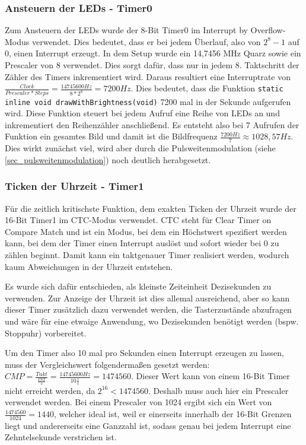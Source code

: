 \subsubsection{Ansteuern der LEDs - Timer0}
Zum Ansteuern der LEDs wurde der 8-Bit Timer0 im \glqq Interrupt by Overflow\grqq -Modus verwendet. Dies bedeutet, dass er bei jedem Überlauf, also von $2^8-1$ auf $0$, einen Interrupt erzeugt. In dem Setup wurde ein 14,7456 MHz Quarz sowie ein Prescaler von 8 verwendet. Dies sorgt dafür, dass nur in jedem 8. Taktschritt der Zähler des Timers inkrementiert wird. Daraus resultiert eine Interruptrate von $\frac{Clock}{Prescaler * Steps} = \frac{14745600 Hz}{8 * 2^8} = 7200 Hz$. Dies bedeutet, dass die Funktion \texttt{static inline void drawWithBrightness(void)} 7200 mal in der Sekunde aufgerufen wird. Diese Funktion steuert bei jedem Aufruf eine Reihe von LEDs an und inkrementiert den Reihenzähler anschließend. Es entsteht also bei 7 Aufrufen der Funktion ein gesamtes Bild und damit ist die Bildfrequenz $\frac{7200 Hz}{7} \approx 1028,57 Hz$. Dies wirkt zunächst viel, wird aber durch die Pulsweitenmodulation (siehe \ref{sec_pulsweitenmodulation}) noch deutlich herabgesetzt.

\subsubsection{Ticken der Uhrzeit - Timer1}
Für die zeitlich kritischste Funktion, dem exakten Ticken der Uhrzeit wurde der 16-Bit Timer1 im \glqq CTC\grqq -Modus verwendet. CTC steht für Clear Timer on Compare Match und ist ein Modus, bei dem ein Höchstwert spezifiert werden kann, bei dem der Timer einen Interrupt auslöst und sofort wieder bei 0 zu zählen beginnt. Damit kann ein taktgenauer Timer realisiert werden, wodurch kaum Abweichungen in der Uhrzeit entstehen.

Es wurde sich dafür entschieden, als kleinste Zeiteinheit Dezisekunden zu verwenden. Zur Anzeige der Uhrzeit ist dies allemal ausreichend, aber so kann dieser Timer zusätzlich dazu verwendet werden, die Tasterzustände abzufragen und wäre für eine etwaige Anwendung, wo Dezisekunden benötigt werden (bspw. Stoppuhr) vorbereitet.

Um den Timer also 10 mal pro Sekunden einen Interrupt erzeugen zu lassen, muss der Vergleichswert folgendermaßen gesetzt werden: $CMP = \frac{Takt}{\frac{INT}{s}} = \frac{14745600 Hz}{10 \frac{1}{s}} = 1474560$. Dieser Wert kann von einem 16-Bit Timer nicht erreicht werden, da $2^16 < 1474560$. Deshalb muss auch hier ein Prescaler verwendet werden. Bei einem Prescaler von 1024 ergibt sich ein Wert von $\frac{1474560}{1024} = 1440$, welcher ideal ist, weil er einerseits innerhalb der 16-Bit Grenzen liegt und andererseits eine Ganzzahl ist, sodass genau bei jedem Interrupt eine Zehntelsekunde verstrichen ist.

